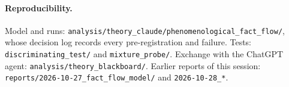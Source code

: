 \documentclass[10pt,a4paper]{article}
\begin{document}
\paragraph{Reproducibility.} Model and runs: \nolinkurl{analysis/theory_claude/phenomenological_fact_flow/}, whose
decision log records every pre-registration and failure. Tests: \nolinkurl{discriminating_test/} and
\nolinkurl{mixture_probe/}. Exchange with the ChatGPT agent: \nolinkurl{analysis/theory_blackboard/}. Earlier reports of
this session: \nolinkurl{reports/2026-10-27_fact_flow_model/} and \nolinkurl{2026-10-28_*}.
\end{document}
